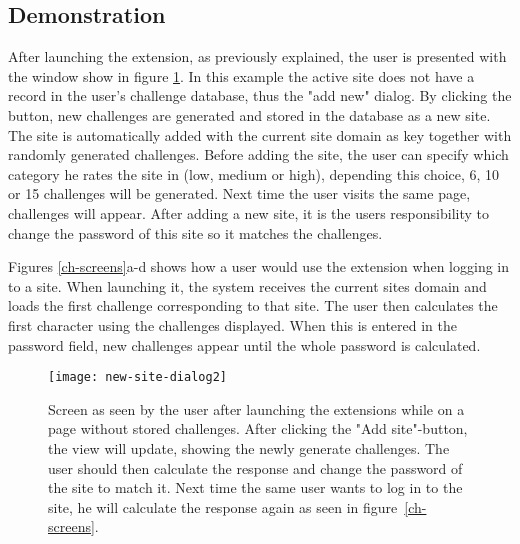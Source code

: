 

\subsection{Demonstration}\label{demo}
After launching the extension, as previously explained, the user is presented with the window show in figure \ref{launch-screen}. In this example the active site does not have a record in the user's challenge database, thus the "add new" dialog. By clicking the button, new challenges are generated and stored in the database as a new site. The site is automatically added with the current site domain as key together with randomly generated challenges. Before adding the site, the user can specify which category he rates the site in (low, medium or high), depending this choice, 6, 10 or 15 challenges will be generated. Next time the user visits the same page, challenges will appear. After adding a new site, it is the users responsibility to change the password of this site so it matches the challenges.

\par Figures \ref{ch-screens}a-d shows how a user would use the extension when logging in to a site. When launching it, the system receives the current sites domain and loads the first challenge corresponding to that site. The user then calculates the first character using the challenges displayed. When this is entered in the password field, new challenges appear until the whole password is calculated. 

\begin{figure}
    \centering
    \texttt{[image: new-site-dialog2]} 
    \caption{Screen as seen by the user after launching the extensions while on a page without stored challenges. After clicking the "Add site"-button, the view will update, showing the newly generate challenges. The user should then calculate the response and change the password of the site to match it. Next time the same user wants to log in to the site, he will calculate the response again as seen in figure~\ref{ch-screens}.}
    \label{launch-screen}
\end{figure}

